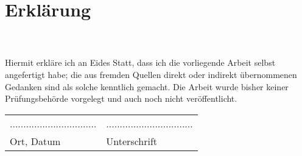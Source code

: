 \section*{Erklärung}
\ThesisAuthor \\
\ThesisAuthorAddress \\
\newline
Hiermit erkläre ich an Eides Statt, dass ich die vorliegende Arbeit selbst angefertigt habe; die aus fremden Quellen direkt oder indirekt übernommenen Gedanken sind als solche kenntlich gemacht.
\newline
Die Arbeit wurde bisher keiner Prüfungsbehörde vorgelegt und auch noch nicht veröffentlicht.
\newline


\begin{tabular}{ll}
................................ & ................................ \\ 
Ort, Datum & Unterschrift
\end{tabular}
